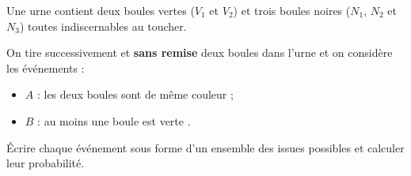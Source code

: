 \begin{exo}
	Une urne contient deux boules vertes ($V_1$ et $V_2$) et trois boules noires ($N_1$, $N_2$ et $N_3$) toutes indiscernables au toucher.

	On tire successivement et \textbf{sans remise} deux boules dans l'urne et on considère les événements :
	\begin{itemize}[label=$\bullet$]
		\item $A$ : \og{} les deux boules sont de même couleur \fg{} ;
		\item $B$ : \og{} au moins une boule est verte \fg{}.
	\end{itemize}

	Écrire chaque événement sous forme d'un ensemble des issues possibles et calculer leur probabilité.
\end{exo}
